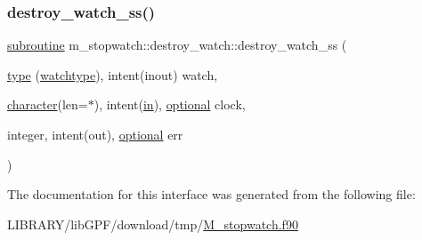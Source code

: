 \subsubsection{\texorpdfstring{destroy\+\_\+watch\+\_\+ss()}{destroy\_watch\_ss()}}
{\footnotesize\ttfamily \hyperlink{M__stopwatch_83_8txt_acfbcff50169d691ff02d4a123ed70482}{subroutine} m\+\_\+stopwatch\+::destroy\+\_\+watch\+::destroy\+\_\+watch\+\_\+ss (\begin{DoxyParamCaption}\item[{\hyperlink{stop__watch_83_8txt_a70f0ead91c32e25323c03265aa302c1c}{type} (\hyperlink{structm__stopwatch_1_1watchtype}{watchtype}), intent(inout)}]{watch,  }\item[{\hyperlink{option__stopwatch_83_8txt_abd4b21fbbd175834027b5224bfe97e66}{character}(len=$\ast$), intent(\hyperlink{M__journal_83_8txt_afce72651d1eed785a2132bee863b2f38}{in}), \hyperlink{option__stopwatch_83_8txt_aa4ece75e7acf58a4843f70fe18c3ade5}{optional}}]{clock,  }\item[{integer, intent(out), \hyperlink{option__stopwatch_83_8txt_aa4ece75e7acf58a4843f70fe18c3ade5}{optional}}]{err }\end{DoxyParamCaption})\hspace{0.3cm}{\ttfamily [private]}}



The documentation for this interface was generated from the following file\+:\begin{DoxyCompactItemize}
\item 
L\+I\+B\+R\+A\+R\+Y/lib\+G\+P\+F/download/tmp/\hyperlink{M__stopwatch_8f90}{M\+\_\+stopwatch.\+f90}\end{DoxyCompactItemize}
